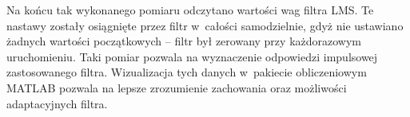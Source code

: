 Na końcu tak wykonanego pomiaru odczytano wartości wag filtra LMS. Te nastawy zostały osiągnięte przez filtr w~całości samodzielnie, gdyż nie ustawiano żadnych wartości początkowych -- filtr był zerowany przy każdorazowym uruchomieniu. Taki pomiar pozwala na wyznaczenie odpowiedzi impulsowej zastosowanego filtra. Wizualizacja tych danych w~pakiecie obliczeniowym MATLAB pozwala na lepsze zrozumienie zachowania oraz możliwości adaptacyjnych filtra.
